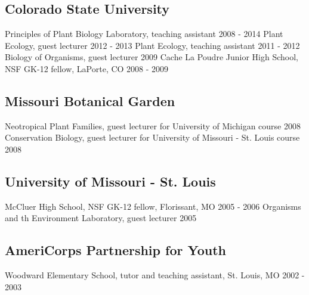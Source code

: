 \documentclass[11pt,english]{article}\usepackage[]{graphicx}\usepackage[]{color}
\begin{document}
\subsection*{Colorado State University}
Principles of Plant Biology Laboratory, teaching assistant \hfill {2008 - 2014} \newline
Plant Ecology, guest lecturer \hfill {2012 - 2013} \newline
Plant Ecology, teaching assistant \hfill {2011 - 2012} \newline
Biology of Organisms, guest lecturer \hfill {2009} \newline
Cache La Poudre Junior High School, NSF GK-12 fellow, LaPorte, CO \hfill {2008 - 2009}

\subsection*{Missouri Botanical Garden}
Neotropical Plant Families, guest lecturer for University of Michigan course \hfill {2008} \newline
Conservation Biology, guest lecturer for University of Missouri - St. Louis course \hfill {2008} 

\subsection*{University of Missouri - St. Louis}
McCluer High School, NSF GK-12 fellow, Florissant, MO \hfill {2005 - 2006} \newline
Organisms and th Environment Laboratory, guest lecturer \hfill {2005} 

\subsection*{AmeriCorps Partnership for Youth}
Woodward Elementary School, tutor and teaching assistant, St. Louis, MO \hfill {2002 - 2003} 

\end{document}
